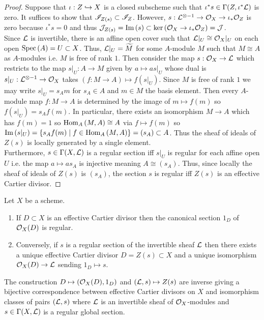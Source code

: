 \documentclass[12pt]{article}
\begin{document}
\begin{proof}
Suppose that $\iota : Z \hookrightarrow X$ is a closed subscheme such that $\iota^* s \in \Gamma(Z, \iota^* \mathcal{L})$ is zero. It suffices to show that $\mathscr{I}_{Z(s)} \subset \mathscr{I}_{Z}$. However, $s : \mathcal{L}^{\otimes -1} \to \mathcal{O}_{X} \to \iota_* \mathcal{O}_{Z}$ is zero because $\iota^* s = 0$ and thus $\mathcal{J}_{Z(s)} = \mathrm{Im}\left( s \right) \subset \ker{(\mathcal{O}_{X} \to \iota_* \mathcal{O}_{Z})} = \mathcal{J}$.
\bigskip\\
Since $\mathcal{L}$ is invertible, there is an affine open cover such that $\mathcal{L} |_U \cong \mathcal{O}_{X} |_U$ on each open $\mathrm{Spec}\left( A \right) = U \subset X$. Thus, $\mathcal{L}|_U = \widetilde{M}$ for some $A$-module $M$ such that $M \cong A$ as $A$-modules i.e. $M$ is free of rank $1$. Then consider the map $s : \mathcal{O}_{X} \to \mathcal{L}$ which restricts to the map $s |_U : A \to M$ given by $a \mapsto a s|_U$ whose dual is $s |_U : \mathcal{L}^{\otimes - 1} \to \mathcal{O}_{X}$ takes $(f : M \to A) \mapsto f(s|_U)$. Since $M$ is free of rank $1$ we may write $s|_U = s_A m$ for $s_A \in A$ and $m \in M$ the basis element. Then every $A$-module map $f : M \to A$ is determined by the image of $m \mapsto f(m)$ so $f(s|_U) = s_A f(m)$. In particular, there exists an isomorphism $M \to A$ which has $f(m) = 1$ so $\mathrm{Hom}_{A} \left( M, A \right) \cong A$ via $f \mapsto f(m)$ so $\mathrm{Im}\left( s|_U \right) = \{s_A f(m) \mid f \in \mathrm{Hom}_{A} \left( M, A \right) \} = (s_A) \subset A$. Thus the sheaf of ideals of $Z(s)$ is locally generated by a single element.
\bigskip\\
Furthermore, $s \in \Gamma(X, \mathcal{L})$ is a regular section iff $s|_U$ is regular for each affine open $U$ i.e. the map $a \mapsto a s_A$ is injective meaning $A \cong (s_A)$. Thus, since locally the sheaf of ideals of $Z(s)$ is $(s_A)$, the section $s$ is regular iff $Z(s)$ is an effective Cartier divisor. 
\end{proof}

\begin{theorem}
Let $X$ be a scheme. 
\begin{enumerate}
\item If $D \subset X$ is an effective Cartier divisor then the canonical section $1_D$ of $\mathcal{O}_{X}(D)$ is regular.
\item Conversely, if $s$ is a regular section of the invertible sheaf $\mathcal{L}$ then there exists a unique effective Cartier divisor $D = Z(s) \subset X$ and a unique isomorphism $\mathcal{O}_{X}(D) \to \mathcal{L}$ sending $1_D \mapsto s$. 
\end{enumerate}
The construction $D \mapsto (\mathcal{O}_{X}(D), 1_D)$ and $(\mathcal{L}, s) \mapsto Z(s)$ are inverse giving a bijective correspondence between effective Cartier divisors on $X$ and isomorphism classes of pairs $(\mathcal{L}, s)$ where $\mathcal{L}$ is an invertible sheaf of $\mathcal{O}_{X}$-modules and $s \in \Gamma(X, \mathcal{L})$ is a regular global section. 
\end{theorem}
\end{document}
